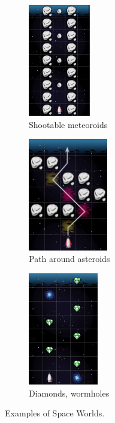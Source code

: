 \begin{figure}[htb]
\centering
\begin{subfigure}[t]{0.3\textwidth}
\centering
\includegraphics[height=49mm]{img/spaceworld-meteoroids}
\caption{Shootable meteoroids}
\label{fig:spaceworld-meteoroids}
\end{subfigure}
\begin{subfigure}[t]{0.35\textwidth}
\centering
\includegraphics[height=49mm]{img/spaceworld-path}
\caption{Path around asteroids}
\label{fig:spaceworld-path}
\end{subfigure}%
\begin{subfigure}[t]{0.33\textwidth}
\centering
\includegraphics[height=49mm]{img/spaceworld-wormholes}
\caption{Diamonds, wormholes}
\label{fig:spaceworld-wormholes}
\end{subfigure}
\caption{Examples of Space Worlds.}
\label{fig:spaceworld}
\end{figure}




